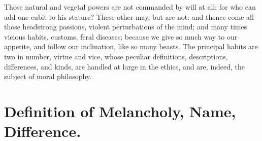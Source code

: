 {Those natural and vegetal powers are not commanded by will at all; for
who can add one cubit to his stature? These other may, but are not: and
thence come all those headstrong passions, violent perturbations of the
mind; and many times vicious habits, customs, feral diseases; because
we give so much way to our appetite, and follow our inclination, like
so many beasts. The principal habits are two in number, virtue and
vice, whose peculiar definitions, descriptions, differences, and kinds,
are handled at large in the ethics, and are, indeed, the subject of
moral philosophy.


\section{Definition of Melancholy, Name, Difference.}

}
